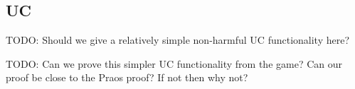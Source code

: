 \subsection{UC}

TODO:  Should we give a relatively simple non-harmful UC functionality here?

TODO:  Can we prove this simpler UC functionality from the game?  Can our proof be close to the Praos proof?  If not then why not?


















\endinput 



\def\sid{\ensuremath{\mathtt{sid}}}


